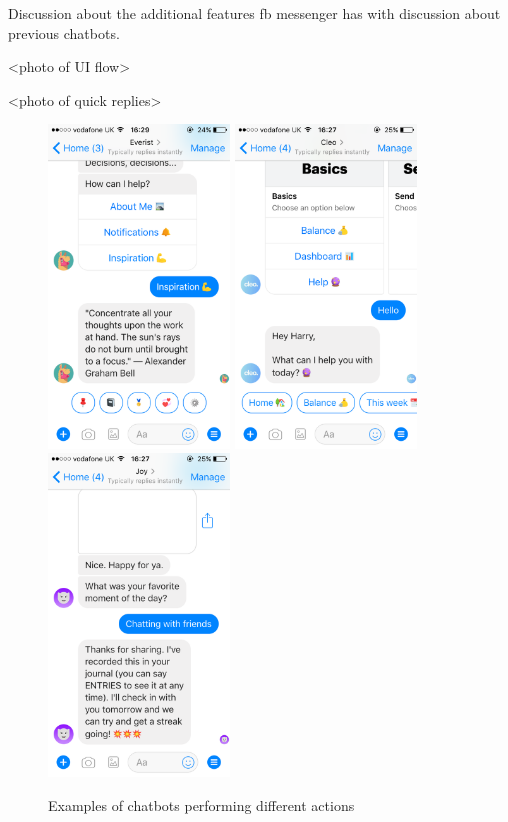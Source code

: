Discussion about the additional features fb messenger has with discussion about previous chatbots.

<photo of UI flow>

<photo of quick replies>

\begin{figure}[ht]
  \centering
  \includegraphics[width=1.9in]{../resources/everist.png}
  \hspace{10px}
  \includegraphics[width=1.9in]{../resources/cleo.png}
  \hspace{10px}
  \includegraphics[width=1.9in]{../resources/joy-ai.png}
  \caption{Examples of chatbots performing different actions}
  \label{fig:chatbots_examples}
\end{figure}


